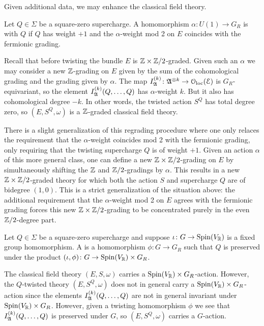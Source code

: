 \documentclass[10pt, oneside]{article}
\begin{document}
Given additional data, we may enhance the classical field theory.

\begin{definition}
Let $Q\in\Sigma$ be a square-zero supercharge. A homomorphism $\alpha\colon U(1)\rightarrow G_R$ is  with $Q$ if $Q$ has weight $+1$ and the $\alpha$-weight mod 2 on $E$ coincides with the fermionic grading.
\end{definition}

Recall that before twisting the bundle $E$ is $\mathbb Z \times \mathbb Z/2$-graded.
Given such an $\alpha$ we may consider a new $\mathbb Z$-grading on $E$ given by the sum of the cohomological grading and the grading given by $\alpha$. The map $I_{\mathfrak A}^{(k)}\colon \mathfrak A^{\otimes k} \to \mathcal{O}_{\rm loc}(\mathcal E)$ is $G_R$-equivariant, so the element $I_{\mathfrak A}^{(k)}(Q, \dots, Q)$ has $\alpha$-weight $k$. But it also has cohomological degree $-k$. In other words, the twisted action $S^Q$ has total degree zero, so $(E, S^Q, \omega)$ is a $\mathbb Z$-graded classical field theory.

\begin{remark}
There is a slight generalization of this regrading procedure where one only relaces the requirement that the $\alpha$-weight coincides mod 2 with the fermionic grading, only requiring that the twisting supercharge $Q$ is of weight $+1$.  Given an action $\alpha$ of this more general class, one can define a new $\mathbb Z \times \mathbb Z/2$-grading on $E$ by simultaneously shifting the $\mathbb Z$ and $\mathbb Z/2$-gradings by $\alpha$. This results in a new $\mathbb Z \times \mathbb Z/2$-graded theory for which both the action $S$ and supercharge $Q$ are of bidegree $(1,0)$. This is a strict generalization of the situation above: the additional requirement that the $\alpha$-weight mod 2 on $E$ agrees with the fermionic grading forces this new $\mathbb Z \times \mathbb Z/2$-grading to be concentrated purely in the even $\mathbb Z/2$-degree part.
\end{remark} 
 
\begin{definition}
Let $Q\in\Sigma$ be a square-zero supercharge and suppose $\iota \colon G\rightarrow \mathrm{Spin}(V_\mathbb R)$ is a fixed group homomorphism. A  is a homomorphism $\phi\colon G\rightarrow G_R$ such that $Q$ is preserved under the product $(\iota, \phi) \colon G\rightarrow \mathrm{Spin}(V_\mathbb R)\times G_R$.
\end{definition}

The classical field theory $(E, S, \omega)$ carries a $\mathrm{Spin}(V_\mathbb R)\times G_R$-action. However, the $Q$-twisted theory $(E, S^Q, \omega)$ does not in general carry a $\mathrm{Spin}(V_\mathbb R)\times G_R$-action since the elements $I_{\mathfrak A}^{(k)}(Q, \dots, Q)$ are not in general invariant under $\mathrm{Spin}(V_\mathbb R)\times G_R$. However, given a twisting homomorphism $\phi$ we see that $I_{\mathfrak A}^{(k)}(Q, \dots, Q)$ is preserved under $G$, so $(E, S^Q, \omega)$ carries a $G$-action.
\end{document}
